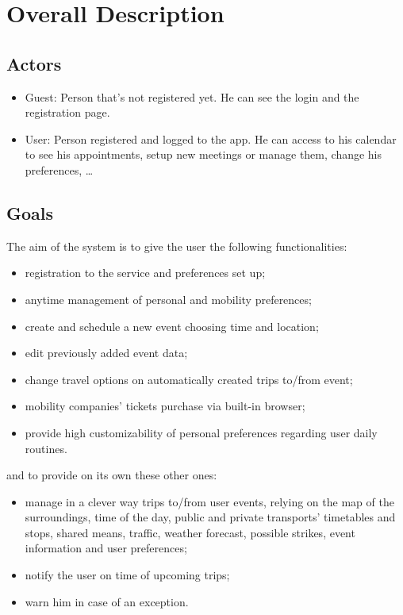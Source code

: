 %
%
\chapter{Overall Description}
%
\label{cap:overalldescription}
%
%
\section{Actors}
\begin{itemize}
\item Guest: Person that’s not registered yet. He can see the login and the registration page.
\item User: Person registered and logged to the app. He can access to his calendar to see his appointments, setup new meetings or manage them, change his preferences, …
\end{itemize}
%
%
\section{Goals}
The aim of the system is to give the user the following functionalities:
\begin{itemize}
\item registration to the service and preferences set up;
\item anytime management of personal and mobility preferences;
\item create and schedule a new event choosing time and location;
\item edit previously added event data;
\item change travel options on automatically created trips to/from event;
\item mobility companies’ tickets purchase via built-in browser;
\item provide high customizability of personal preferences regarding user daily routines.
\end{itemize}
and to provide on its own these other ones:
\begin{itemize}
\item manage in a clever way trips to/from user events, relying on the map of the surroundings, time of the day, public and private transports’ timetables and stops, shared means, traffic, weather forecast, possible strikes, event information and user preferences;
\item notify the user on time of upcoming trips;
\item warn him in case of an exception.
\end{itemize}
%
%
